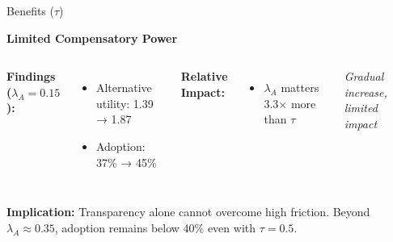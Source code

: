 \documentclass[aspectratio=169]{beamer}
\begin{document}
\begin{frame}{Benefits ($\tau$)}
    
    \textbf{Limited Compensatory Power}
    
    \vspace{0.3cm}
    \begin{columns}
        \textbf{Findings ($\lambda_A = 0.15$):}
        \begin{itemize}
            \item Alternative utility: 1.39 → 1.87
            \item Adoption: 37\% → 45\%
        \end{itemize}
              
        \vspace{0.3cm}
        \textbf{Relative Impact:}
        \begin{itemize}
            \item $\lambda_A$ matters 3.3× more than $\tau$
        \end{itemize}
        
        \centering
        
        \vspace{0.3cm}
        \small{\textit{Gradual increase, limited impact}}
    \end{columns}
    
    \vspace{0.3cm}
    \textbf{Implication:} Transparency alone cannot overcome high friction. Beyond $\lambda_A \approx 0.35$, adoption remains below 40\% even with $\tau = 0.5$.

\end{frame}
\end{document}
